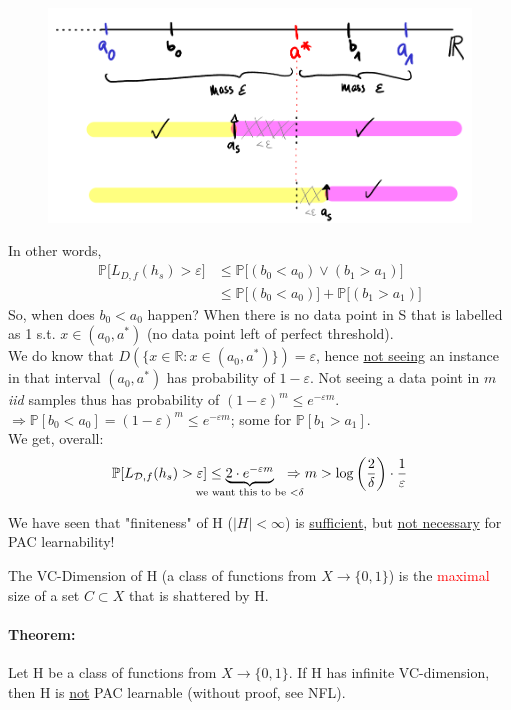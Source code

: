 \documentclass[10pt,a4paper]{article}
\theoremstyle{definition}
\theoremstyle{plain}
\begin{document}
\begin{figure}[H]
	\centering
	\includegraphics[width=0.7\linewidth]{sketch_6}
	\label{fig:sketch6}
\end{figure}
In other words, 
\begin{align*}
	\mathbb{P}\big[L_{D,f}(h_s)>\varepsilon\big] &\leq \mathbb{P}\big[(b_0 < a_0) \lor (b_1 > a_1)\big]\\
	&\leq \mathbb{P}\big[ (b_0<a_0) \big] +\mathbb{P}\big[ (b_1 > a_1) \big]	
\end{align*}
So, when does $b_0 < a_0$ happen? When there is no data point in S that is labelled as 1 s.t. $x \in (a_0, a^*)$ (no data point left of perfect threshold).\\
We do know that $D(\{x \in \mathbb{R}: x\in (a_0, a^{*})\}) = \varepsilon$, hence \underline{not seeing} an instance in that interval $(a_0, a^*)$ has probability of $1-\varepsilon$. Not seeing a data point in $m$ \textit{iid} samples thus has probability of \underline{$(1-\varepsilon)^m \leq e^{-\varepsilon m}$}.\\

$
	\Rightarrow \mathbb{P}[b_0 < a_0] = (1-\varepsilon)^{m} \leq e^{-\varepsilon m}
$; some for $\mathbb{P}[b_1>a_1]$.\\
We get, overall:
$$
	\mathbb{P}[L_{\mathcal{D}, f}(h_s)>\varepsilon] \leq \underbrace{2 \cdot e^{-\varepsilon m}}_{\mathclap{\text{we want this to be } <\delta}} \ \ \Rightarrow m > \log\bigg(\frac{2}{\delta}\bigg) \cdot \frac{1}{\varepsilon}
$$

We have seen that "finiteness" of H ($|H| < \infty$) is \underline{sufficient}, but \underline{not necessary} for PAC learnability!

\begin{boxeddef}[VC-Dimension]
	The VC-Dimension of H (a class of functions from $X \to \{0,1\}$) is the \textcolor{red}{maximal} size of a set $C \subset X$ that is shattered by H.
\end{boxeddef}

\paragraph{Theorem:} Let H be a class of functions from $X \to \{ 0,1 \}$. If H has infinite VC-dimension, then H is \underline{not} PAC learnable (without proof, see NFL).
\end{document}
